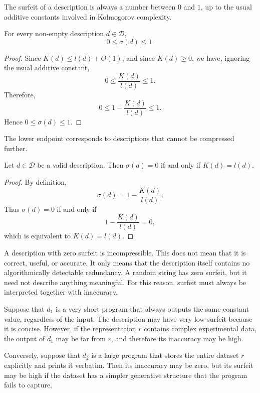 The surfeit of a description is always a number between \(0\) and \(1\), up to the usual additive constants involved in Kolmogorov complexity.

\begin{proposition}
\label{prop:range_surfeit}
For every non-empty description \(d\in\mathcal D\),
\[
0\leq \sigma(d)\leq 1.
\]
\end{proposition}
\begin{proof}
Since \(K(d)\leq l(d)+O(1)\), and since \(K(d)\geq 0\), we have, ignoring the usual additive constant,
\[
0\leq \frac{K(d)}{l(d)}\leq 1.
\]
Therefore,
\[
0\leq 1-\frac{K(d)}{l(d)}\leq 1.
\]
Hence \(0\leq \sigma(d)\leq 1\).
\end{proof}

The lower endpoint corresponds to descriptions that cannot be compressed further.

\begin{proposition}
\label{prop:zero_surfeit}
Let \(d\in\mathcal D\) be a valid description. Then $\sigma(d)=0$ if and only if $K(d)=l(d)$.
\end{proposition}

\begin{proof}
By definition,
\[
\sigma(d)=1-\frac{K(d)}{l(d)}.
\]
Thus \(\sigma(d)=0\) if and only if
\[
1-\frac{K(d)}{l(d)}=0,
\]
which is equivalent to $K(d)=l(d)$.
\end{proof}

A description with zero surfeit is incompressible. This does not mean that it is correct, useful, or accurate. It only means that the description itself contains no algorithmically detectable redundancy. A random string has zero surfeit, but it need not describe anything meaningful. For this reason, surfeit must always be interpreted together with inaccuracy.

\begin{example}
Suppose that \(d_1\) is a very short program that always outputs the same constant value, regardless of the input. The description may have very low surfeit because it is concise. However, if the representation \(r\) contains complex experimental data, the output of \(d_1\) may be far from \(r\), and therefore its inaccuracy may be high.

Conversely, suppose that \(d_2\) is a large program that stores the entire dataset \(r\) explicitly and prints it verbatim. Then its inaccuracy may be zero, but its surfeit may be high if the dataset has a simpler generative structure that the program fails to capture.
\end{example}

